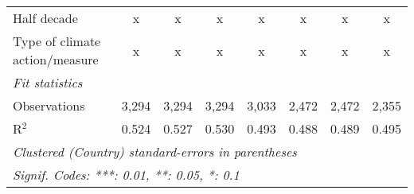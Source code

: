 \begin{table}[htbp]
\begin{tabular}{lccccccc}
      Half decade                                                                   & x            & x            & x             & x            & x              & x              & x\\  
      Type of climate action/measure                                                & x            & x            & x             & x            & x              & x              & x\\  
      \midrule \emph{Fit statistics}\\
      Observations                                                                  & 3,294        & 3,294        & 3,294         & 3,033        & 2,472          & 2,472          & 2,355\\  
      R$^2$                                                                         & 0.524        & 0.527        & 0.530         & 0.493        & 0.488          & 0.489          & 0.495\\  
      \midrule
      \multicolumn{8}{l}{\emph{Clustered (Country) standard-errors in parentheses}}\\
      \multicolumn{8}{l}{\emph{Signif. Codes: ***: 0.01, **: 0.05, *: 0.1}}\\
   \end{tabular}
\end{table}


